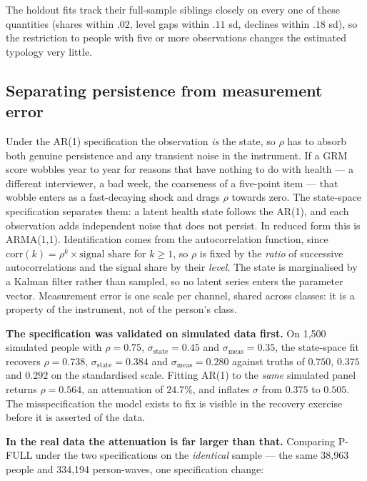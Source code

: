 \documentclass[11pt]{article}
\begin{document}
The holdout fits track their full-sample siblings closely on every one of
these quantities (shares within $.02$, level gaps within $.11$ sd, declines
within $.18$ sd), so the restriction to people with five or more
observations changes the estimated typology very little.

\subsection*{Separating persistence from measurement error}
\label{sec:meas}

Under the AR(1) specification the observation \emph{is} the state, so $\rho$
has to absorb both genuine persistence and any transient noise in the
instrument. If a GRM score wobbles year to year for reasons that have nothing
to do with health --- a different interviewer, a bad week, the coarseness of a
five-point item --- that wobble enters as a fast-decaying shock and drags
$\rho$ towards zero. The state-space specification separates them: a latent
health state follows the AR(1), and each observation adds independent noise
that does not persist. In reduced form this is ARMA(1,1). Identification comes
from the autocorrelation function, since $\text{corr}(k) = \rho^k \times
\text{signal share}$ for $k \ge 1$, so $\rho$ is fixed by the \emph{ratio} of
successive autocorrelations and the signal share by their \emph{level}. The
state is marginalised by a Kalman filter rather than sampled, so no latent
series enters the parameter vector. Measurement error is one scale per
channel, shared across classes: it is a property of the instrument, not of the
person's class.

\textbf{The specification was validated on simulated data first.} On 1,500
simulated people with $\rho = 0.75$, $\sigma_{\text{state}} = 0.45$ and
$\sigma_{\text{meas}} = 0.35$, the state-space fit recovers $\rho = 0.738$,
$\sigma_{\text{state}} = 0.384$ and $\sigma_{\text{meas}} = 0.280$ against
truths of $0.750$, $0.375$ and $0.292$ on the standardised scale. Fitting
AR(1) to the \emph{same} simulated panel returns $\rho = 0.564$, an
attenuation of $24.7\%$, and inflates $\sigma$ from $0.375$ to $0.505$. The
misspecification the model exists to fix is visible in the recovery exercise
before it is asserted of the data.

\textbf{In the real data the attenuation is far larger than that.} Comparing
P-FULL under the two specifications on the \emph{identical} sample --- the
same 38,963 people and 334,194 person-waves, one specification change:
\end{document}
